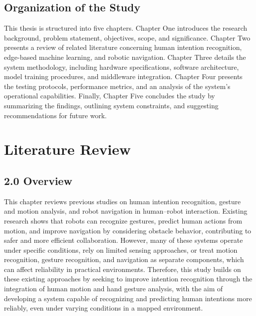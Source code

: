 \section{Organization of the Study}
This thesis is structured into five chapters. Chapter One introduces the research background, problem statement, objectives, scope, and significance. Chapter Two presents a review of related literature concerning human intention recognition, edge-based machine learning, and robotic navigation. Chapter Three details the system methodology, including hardware specifications, software architecture, model training procedures, and middleware integration. Chapter Four presents the testing protocols, performance metrics, and an analysis of the system's operational capabilities. Finally, Chapter Five concludes the study by summarizing the findings, outlining system constraints, and suggesting recommendations for future work.

\cleardoublepage

\chapter{Literature Review}

\section*{2.0 Overview}

This chapter reviews previous studies on human intention recognition, gesture and motion analysis, and robot navigation in human--robot interaction. Existing research shows that robots can recognize gestures, predict human actions from motion, and improve navigation by considering obstacle behavior, contributing to safer and more efficient collaboration. However, many of these systems operate under specific conditions, rely on limited sensing approaches, or treat motion recognition, gesture recognition, and navigation as separate components, which can affect reliability in practical environments. Therefore, this study builds on these existing approaches by seeking to improve intention recognition through the integration of human motion and hand gesture analysis, with the aim of developing a system capable of recognizing and predicting human intentions more reliably, even under varying conditions in a mapped environment.

